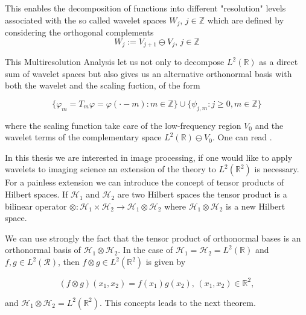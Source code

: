This enables the decomposition of functions into different "resolution" levels associated with the so called wavelet spaces $W_j$, $j\in\mathbb{Z}$ which are defined by considering the orthogonal complements
$$
W_j:= V_{j+1}\ominus V_j\text{,  } j\in\mathbb{Z}
$$

This Multiresolution Analysis let us not only to decompose $L^2(\mathbb{R})$ as a direct sum of wavelet spaces but also gives us an alternative orthonormal basis with both the wavelet and the scaling fuction, of the form

$$
\{\varphi_m=T_m\varphi=\varphi(\cdot-m):m\in\mathbb{Z}\}\cup\{\psi_{j,m}:j\geq 0,m\in\mathbb{Z}\}
$$

where the scaling function take care of the low-frequency region $V_0$ and the wavelet terms of the complementary space $L^2(\mathbb{R})\ominus V_0$. One can read \cite{Mallat}. 

\bigskip

In this thesis we are interested in image processing, if one would like to apply wavelets to imaging science an extension of the theory to $L^2(\mathbb{R}^2)$ is necessary. For a painless extension we can introduce the concept of tensor products of Hilbert spaces. If $\mathcal{H}_1$ and $\mathcal{H}_2$ are two Hilbert spaces the tensor product is a bilinear operator $\otimes:\mathcal{H}_1\times\mathcal{H}_2\longrightarrow \mathcal{H}_1\otimes\mathcal{H}_2$ where $\mathcal{H}_1\otimes\mathcal{H}_2$ is a new Hilbert space.

\bigskip

We can use strongly the fact that the tensor product of orthonormal bases is an orthonormal basis of $\mathcal{H}_1\otimes\mathcal{H}_2$. In the case of $\mathcal{H}_1=\mathcal{H}_2=L^2(\mathbb{R})$ and $f,g\in L^2(\mathcal{R})$, then $f\otimes g\in L^2(\mathbb{R}^2)$ is given by

$$
(f\otimes g)(x_1,x_2)=f(x_1)g(x_2)\text{,  } (x_1,x_2)\in\mathbb{R}^2,
$$

and $\mathcal{H}_1\otimes\mathcal{H}_2=L^2(\mathbb{R}^2)$. This concepts leads to the next theorem.

\bigskip

